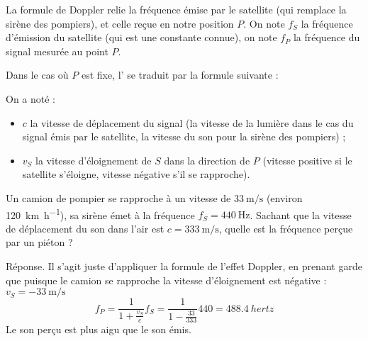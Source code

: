 \documentclass[class=report,crop=false]{standalone}
\begin{document}


\bigskip


La formule de Doppler relie la fréquence émise par le satellite 
(qui remplace la sirène des pompiers), et celle reçue en notre position $P$.
On note $f_S$ la fréquence d'émission du satellite (qui est une constante connue),
on note $f_P$ la fréquence du signal mesurée au point $P$.

\begin{theoreme}
Dans le cas où $P$ est fixe, l' se traduit par la formule suivante :
\end{theoreme}
On a noté :
\begin{itemize}
  \item $c$ la vitesse de déplacement du signal (la vitesse de la lumière dans le cas du signal
  émis par le satellite, la vitesse du son pour la sirène des pompiers) ;
  
  \item $v_S$ la vitesse d'éloignement de $S$ dans la direction de $P$ 
(vitesse positive si le satellite s'éloigne, vitesse négative s'il se rapproche).
\end{itemize}

\begin{exemple}
\label{ex:freqpomp}
Un camion de pompier se rapproche à un vitesse de $\SI{33}{\meter\per\second}$
(environ \SI{120}{\kilo\meter\per\hour}), sa sirène émet à la fréquence
$f_S = \SI{440}{\hertz}$. Sachant que la vitesse de déplacement du son dans l'air
est $c = \SI{333}{\meter\per\second}$, quelle est la fréquence 
perçue par un piéton ?

\bigskip

Réponse. Il s'agit juste d'appliquer la formule de l'effet Doppler, en prenant
garde que puisque le camion se rapproche la vitesse d'éloignement est négative :
$v_S = -\SI{33}{\meter\per\second}$
$$f_P = \frac{1}{1+\frac{v_S}{c}} f_S = \frac{1}{1-\frac{33}{333}} 440
= \SI{488,4}{hertz}$$
Le son perçu est plus aigu que le son émis.  
\end{exemple}
\end{document}
